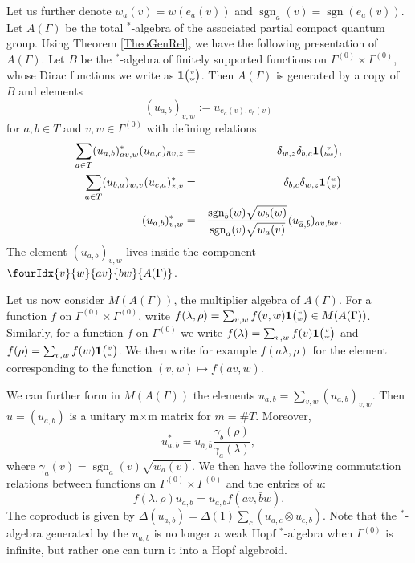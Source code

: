 \documentclass[10pt]{article}
\DeclareMathOperator{\sgn}{\mathrm{sgn}}
\newcommand{\Grt}[3]{#1{\tiny{\begin{pmatrix} #2\\#3\end{pmatrix}}}}
\newcommand{\UnitC}[2]{\Grt{\mathbf{1}}{#1}{#2}}
\newcommand{\Gr}[5]{\fourIdx{#2}{#4}{#3}{#5}{#1}}%
\theoremstyle{definition}
\numberwithin{equation}{section}
\begin{document}
Let us further denote $w_a(v) = w(e_a(v))$ and $\sgn_a(v) = \sgn(e_a(v))$. Let $A(\Gamma)$ be the total $^*$-algebra of the associated partial compact quantum group. Using Theorem \ref{TheoGenRel}, we have the following presentation of $A(\Gamma)$. Let $B$ be the $^*$-algebra of finitely supported functions on $\Gamma^{(0)}\times \Gamma^{(0)}$, whose Dirac functions we write as $\UnitC{v}{w}$. Then $A(\Gamma)$ is generated by a copy of $B$ and elements \[(u_{a,b})_{v,w} := u_{e_a(v),e_b(v)}\] for $a,b\in T$ and $v,w\in \Gamma^{(0)}$ with defining relations \begin{eqnarray*} \sum_{a\in T} (u_{a,b})_{\bar{a}v,w}^* (u_{a,c})_{\bar{a}v,z}&=& \delta_{w,z} \delta_{b,c} \UnitC{v}{bw},\\ \sum_{a\in T} (u_{b,a})_{w,v} (u_{c,a})_{z,v}^* &=& \delta_{b,c}\delta_{w,z} \UnitC{w}{v}\\ (u_{a,b})_{v,w}^* &=& \frac{\sgn_b(w)\sqrt{w_b(w)}}{\sgn_a(v)\sqrt{w_a(v)}}(u_{\bar{a},\bar{b}})_{av,bw}.\end{eqnarray*} The element $(u_{a,b})_{v,w}$ lives inside the component $\Gr{A(\Gamma)}{v}{av}{w}{bw}$.

Let us now consider $M(A(\Gamma))$, the multiplier algebra of $A(\Gamma)$. For a function $f$ on $\Gamma^{(0)}\times \Gamma^{(0)}$, write $f(\lambda,\rho) = \sum_{v,w} f(v,w)\UnitC{v}{w} \in M(A(\Gamma))$. Similarly, for a function $f$ on $\Gamma^{(0)}$ we write $f(\lambda) = \sum_{v,w} f(v)\UnitC{v}{w}$ and $f(\rho) = \sum_{v,w}f(w)\UnitC{v}{w}$. We then write for example $f(a\lambda,\rho)$ for the element corresponding to the function $(v,w)\mapsto f(av,w)$.

We can further form in $M(A(\Gamma))$ the elements $u_{a,b} = \sum_{v,w} (u_{a,b})_{v,w}$. Then $u=(u_{a,b})$ is a unitary m$\times$m matrix for $m=\#T$. Moreover, \begin{equation}\label{EqAdju}u_{a,b}^* =  u_{\bar{a},\bar{b}}\frac{\gamma_b(\rho)}{\gamma_a(\lambda)},\end{equation} where $\gamma_a(v) = \sgn_a(v)\sqrt{w_a(v)}$.   We then have the following commutation relations between functions on $\Gamma^{(0)}\times \Gamma^{(0)}$ and the entries of $u$: \begin{equation}\label{EqGradu} f(\lambda,\rho)u_{a,b} = u_{a,b}f(\bar{a}v,\bar{b}w).\end{equation} The coproduct is given by $\Delta(u_{a,b}) = \Delta(1) \sum_c(u_{a,c}\otimes u_{c,b})$. Note that the $^*$-algebra generated by the $u_{a,b}$ is no longer a weak Hopf $^*$-algebra when $\Gamma^{(0)}$ is infinite, but rather one can turn it into a Hopf algebroid. %
\end{document}
